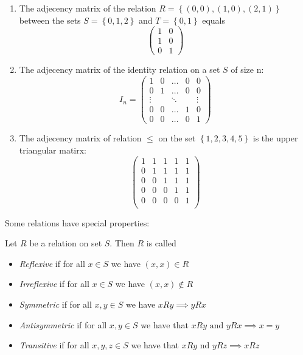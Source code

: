 \begin{example}
    \begin{enumerate}
        \item The adjecency matrix of the relation $ R = \left\{\left(0,0\right), \left(1,0\right),\left(2,1\right)\right\} $ between the sets $ S = \left\{0,1,2\right\} $ and $ T = \left\{0,1\right\} $ equals
        $$ \begin{pmatrix}
            1 & 0 \\
            1 & 0 \\
            0 & 1
        \end{pmatrix} $$
        \item The adjecency matrix of the identity relation on a set $S$ of size n:
        $$ I_n = \begin{pmatrix}
            1 & 0 & \dots & 0 & 0 \\
            0 & 1 & \dots & 0 & 0 \\
            \vdots & & \ddots & & \vdots \\
            0 & 0 & \dots & 1 & 0 \\
            0 & 0 & \dots & 0 & 1
        \end{pmatrix} $$
        \item The adjecency matrix of relation $ \leq $ on the set $ \left\{1,2,3,4,5\right\} $ is the upper triangular matirx:
        $$ \begin{pmatrix}
            1 & 1 & 1 & 1 & 1\\
            0 & 1 & 1 & 1 & 1\\
            0 & 0 & 1 & 1 & 1\\
            0 & 0 & 0 & 1 & 1\\
            0 & 0 & 0 & 0 & 1\\

        \end{pmatrix} $$
    \end{enumerate}
\end{example}

Some relations have special properties:
\begin{definition}
    Let $ R $ be a relation on set $S$. Then $R$ is called
    \begin{itemize}
        \item \emph{Reflexive} if for all $ x \in S $ we have $ (x,x) \in R $
        \item \emph{Irreflexive} if for all $ x \in S $ we have $ (x,x) \notin R $
        \item \emph{Symmetric} if for all $ x,y \in S $ we have $ xRy \implies yRx $
        \item \emph{Antisymmetric} if for all $ x,y \in S $ we have that $ xRy \text{ and } yRx \implies x = y$
        \item \emph{Transitive} if for all $ x,y,z \in S $ we have that $ xRy $ nd $ yRz \implies xRz$
    \end{itemize}
\end{definition}


